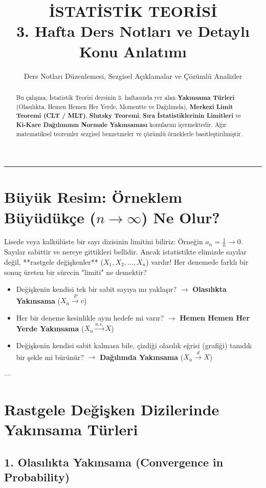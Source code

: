 \documentclass[12pt,a4paper]{article}
\title{\textbf{İSTATİSTİK TEORİSİ}\\[0.3em] \Large 3. Hafta Ders Notları ve Detaylı Konu Anlatımı}
\author{Ders Notları Düzenlemesi, Sezgisel Açıklamalar ve Çözümlü Analizler}
\date{}
\begin{document}
\maketitle

\begin{abstract}
Bu çalışma; İstatistik Teorisi dersinin 3. haftasında yer alan \textbf{Yakınsama Türleri} (Olasılıkta, Hemen Hemen Her Yerde, Momentte ve Dağılımda), \textbf{Merkezi Limit Teoremi (CLT / MLT)}, \textbf{Slutsky Teoremi}, \textbf{Sıra İstatistiklerinin Limitleri} ve \textbf{Ki-Kare Dağılımının Normale Yakınsaması} konularını içermektedir. Ağır matematiksel teoremler sezgisel benzetmeler ve çözümlü örneklerle basitleştirilmiştir.
\end{abstract}

\hrule
\vspace{1em}

\section{Büyük Resim: Örneklem Büyüdükçe (\texorpdfstring{$n \to \infty$}{n sonsuza giderken}) Ne Olur?}

Lisede veya kalkülüste bir sayı dizisinin limitini biliriz: Örneğin $a_n = \frac{1}{n} \to 0$. Sayılar sabittir ve nereye gittikleri bellidir.  
Ancak istatistikte elimizde sayılar değil, **rastgele değişkenler** ($X_1, X_2, \dots, X_n$) vardır!  
Her denemede farklı bir sonuç üreten bir sürecin "limiti" ne demektir?
\begin{itemize}
    \item Değişkenin kendisi tek bir sabit sayıya mı yaklaşır? $\longrightarrow$ \textbf{Olasılıkta Yakınsama} ($X_n \xrightarrow{P} c$)
    \item Her bir deneme kesinlikle aynı hedefe mi varır? $\longrightarrow$ \textbf{Hemen Hemen Her Yerde Yakınsama} ($X_n \xrightarrow{a.s.} X$)
    \item Değişkenin kendisi sabit kalmasa bile, çizdiği olasılık eğrisi (grafiği) tanıdık bir şekle mi bürünür? $\longrightarrow$ \textbf{Dağılımda Yakınsama} ($X_n \xrightarrow{d} X$)
\end{itemize}

---

\section{Rastgele Değişken Dizilerinde Yakınsama Türleri}

\subsection{1. Olasılıkta Yakınsama (Convergence in Probability)}
\end{document}
